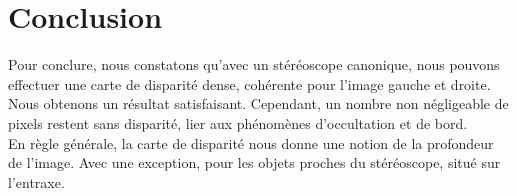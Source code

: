 \documentclass[a4paper,11pt]{article}
\begin{document}
\section{Conclusion}

Pour conclure, nous constatons qu'avec un stéréoscope canonique, nous pouvons effectuer 
une carte de disparité dense, cohérente pour l'image gauche et droite. Nous obtenons un 
résultat satisfaisant. Cependant, un nombre non négligeable de pixels restent sans disparité, 
lier aux phénomènes d'occultation et de bord.\\

En règle générale, la carte de disparité nous donne une notion de la profondeur de l'image. 
Avec une exception, pour les objets proches du stéréoscope, situé sur l'entraxe.\\
\end{document}
